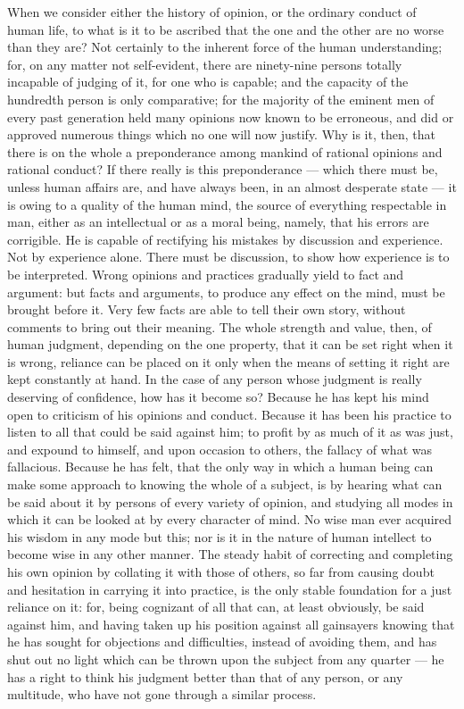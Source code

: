 \documentclass[12pt]{report}
\begin{document}
When we consider either the history of opinion, or the ordinary conduct of human life, to what is it to be ascribed that the one and the other are no worse than they are? Not certainly to the inherent force of the human understanding; for, on any matter not self-evident, there are ninety-nine persons totally incapable of judging of it, for one who is capable; and the capacity of the hundredth person is only comparative; for the majority of the eminent men of every past generation held many opinions now known to be erroneous, and did or approved numerous things which no one will now justify. Why is it, then, that there is on the whole a preponderance among mankind of rational opinions and rational conduct? If there really is this preponderance — which there must be, unless human affairs are, and have always been, in an almost desperate state — it is owing to a quality of the human mind, the source of everything respectable in man, either as an intellectual or as a moral being, namely, that his errors are corrigible. He is capable of rectifying his mistakes by discussion and experience. Not by experience alone. There must be discussion, to show how experience is to be interpreted. Wrong opinions and practices gradually yield to fact and argument: but facts and arguments, to produce any effect on the mind, must be brought before it. Very few facts are able to tell their own story, without comments to bring out their meaning. The whole strength and value, then, of human judgment, depending on the one property, that it can be set right when it is wrong, reliance can be placed on it only when the means of setting it right are kept constantly at hand. In the case of any person whose judgment is really deserving of confidence, how has it become so? Because he has kept his mind open to criticism of his opinions and conduct. Because it has been his practice to listen to all that could be said against him; to profit by as much of it as was just, and expound to himself, and upon occasion to others, the fallacy of what was fallacious. Because he has felt, that the only way in which a human being can make some approach to knowing the whole of a subject, is by hearing what can be said about it by persons of every variety of opinion, and studying all modes in which it can be looked at by every character of mind. No wise man ever acquired his wisdom in any mode but this; nor is it in the nature of human intellect to become wise in any other manner. The steady habit of correcting and completing his own opinion by collating it with those of others, so far from causing doubt and hesitation in carrying it into practice, is the only stable foundation for a just reliance on it: for, being cognizant of all that can, at least obviously, be said against him, and having taken up his position against all gainsayers knowing that he has sought for objections and difficulties, instead of avoiding them, and has shut out no light which can be thrown upon the subject from any quarter — he has a right to think his judgment better than that of any person, or any multitude, who have not gone through a similar process.
\end{document}
